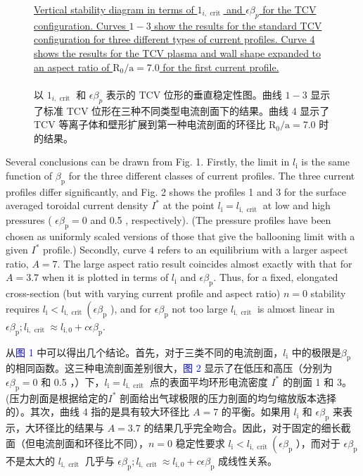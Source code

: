 \documentclass[utf8]{ctexart}
\newcommand\enzhbox[2]{
  	\quad\par \begin{paracol}{2} \colseprulecolor{black} 
  		\begin{spacing}{1.0}
  			\footnotesize  #1
  		\end{spacing}
  		\switchcolumn[1] 
  		#2
  	\end{paracol} \quad\par
  }
\begin{document}
\begin{sloppypar}
\begin{figure}[H]
 \caption{\uline{Vertical stability diagram in terms of $1_{i, \text { crit }}$ and $\epsilon \beta_{p}$ for the TCV configuration. Curves $1-3$ show the results for the standard TCV configuration for three different types of current profiles. Curve 4 shows the results for the TCV plasma and wall shape expanded to an aspect ratio of $\mathrm{R}_{0} / \mathrm{a}=7.0$ for the first current profile.\\}\\以 $1_{i, \text { crit }}$  和 $\epsilon \beta_{p}$  表示的 TCV 位形的垂直稳定性图。曲线 $1-3$  显示了标准 TCV 位形在三种不同类型电流剖面下的结果。曲线 4 显示了 TCV 等离子体和壁形扩展到第一种电流剖面的环径比 $\mathrm{R}_{0} / \mathrm{a}=7.0$  时的结果。}
  	\label{fig1.}
  \end{figure}
  
  
 
\enzhbox{  Several conclusions can be drawn from Fig. 1. Firstly, the limit in $l_{\mathrm{i}}$ is the same function of $\beta_{\mathrm{p}}$ for the three different classes of current profiles. The three current profiles differ significantly, and Fig. 2 shows the profiles 1 and 3 for the surface averaged toroidal current density $I^{*}$ at the point $l_{\mathrm{i}}=l_{\mathrm{i}, \text { crit }}$ at low and high pressures ( $\epsilon \beta_{\mathrm{p}}=0$ and 0.5 , respectively). (The pressure profiles have been chosen as uniformly scaled versions of those that give the ballooning limit with a given $I^{*}$ profile.) Secondly, curve 4 refers to an equilibrium with a larger aspect ratio, $A=7$. The large aspect ratio result coincides almost exactly with that for $A=3.7$ when it is plotted in terms of $l_{\mathrm{i}}$ and $\epsilon \beta_{\mathrm{p}}$. Thus, for a fixed, elongated cross-section (but with varying current profile and aspect ratio) $n=0$ stability requires $l_{\mathrm{i}}<l_{\mathrm{i}, \text { crit }}\left(\epsilon \beta_{\mathrm{p}}\right.$ ), and for $\epsilon \beta_{\mathrm{p}}$ not too large $l_{\mathrm{i}, \text { crit }}$ is almost linear in $\epsilon \beta_{\mathrm{p}} ; l_{\mathrm{i}, \text { crit }} \approx l_{\mathrm{i}, 0}+c \epsilon \beta_{\mathrm{p}}$.}{
从\textcolor{blue}{图 1} 中可以得出几个结论。首先，对于三类不同的电流剖面，$l_{\mathrm{i}}$  中的极限是$\beta_{\mathrm{p}}$  的相同函数。这三种电流剖面差别很大，\textcolor{blue}{图 2} 显示了在低压和高压（分别为 $\epsilon \beta_{\mathrm{p}}=0$  和 0.5 ，）下，$l_{\mathrm{i}}=l_{\mathrm{i}, \text { crit }}$  点的表面平均环形电流密度 $I^{*}$  的剖面 1 和 3。(压力剖面是根据给定的$I^{*}$ 剖面给出气球极限的压力剖面的均匀缩放版本选择的）。其次，曲线 4 指的是具有较大环径比 $A=7$ 的平衡。如果用 $l_{\mathrm{i}}$  和 $\epsilon \beta_{\mathrm{p}}$ 来表示，大环径比的结果与 $A=3.7$  的结果几乎完全吻合。因此，对于固定的细长截面（但电流剖面和环径比不同），$n=0$  稳定性要求 $l_{\mathrm{i}}<l_{\mathrm{i}, \text { crit }}\left(\epsilon \beta_{\mathrm{p}}\right.$  ），而对于 $\epsilon \beta_{\mathrm{p}}$ 不是太大的 $l_{\mathrm{i}, \text { crit }}$  几乎与 $\epsilon \beta_{\mathrm{p}} ; l_{\mathrm{i}, \text { crit }} \approx l_{\mathrm{i}, 0}+c \epsilon \beta_{\mathrm{p}}$ 成线性关系。}
  

\end{sloppypar}
\end{document}
